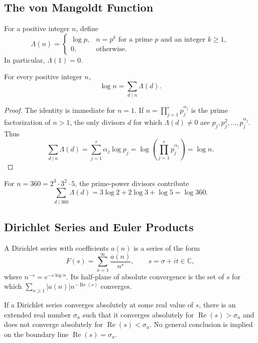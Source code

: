 \subsection{The von Mangoldt Function}

\begin{definition}
For a positive integer $n$, define
\[
 \Lambda(n)=
 \begin{cases}
 \log p,& n=p^k\text{ for a prime }p\text{ and an integer }k\geq1,\\
 0,&\text{otherwise}.
 \end{cases}
\]
In particular, $\Lambda(1)=0$.
\end{definition}

\begin{theorem}
For every positive integer $n$,
\[
 \log n=\sum_{d\mid n}\Lambda(d).
\]
\end{theorem}

\begin{proof}
The identity is immediate for $n=1$. If $n=\prod_{j=1}^r p_j^{\alpha_j}$ is the prime factorization of $n>1$, the only divisors $d$ for which $\Lambda(d)\neq0$ are $p_j,p_j^2,\ldots,p_j^{\alpha_j}$. Thus
\[
 \sum_{d\mid n}\Lambda(d)
 =\sum_{j=1}^r\alpha_j\log p_j
 =\log\left(\prod_{j=1}^r p_j^{\alpha_j}\right)=\log n.
\]
\end{proof}

\begin{example}
For $n=360=2^3\cdot3^2\cdot5$, the prime-power divisors contribute
\[
 \sum_{d\mid360}\Lambda(d)=3\log2+2\log3+\log5=\log360.
\]
\end{example}

\subsection{Dirichlet Series and Euler Products}

\begin{definition}
A Dirichlet series with coefficients $a(n)$ is a series of the form
\[
 F(s)=\sum_{n=1}^{\infty}\frac{a(n)}{n^s},
 \qquad s=\sigma+it\in\mathbb{C},
\]
where $n^{-s}=e^{-s\log n}$. Its half-plane of absolute convergence is the set of $s$ for which $\sum_{n\geq1}|a(n)|n^{-\operatorname{Re}(s)}$ converges.
\end{definition}

\begin{theorem}
If a Dirichlet series converges absolutely at some real value of $s$, there is an extended real number $\sigma_a$ such that it converges absolutely for $\operatorname{Re}(s)>\sigma_a$ and does not converge absolutely for $\operatorname{Re}(s)<\sigma_a$. No general conclusion is implied on the boundary line $\operatorname{Re}(s)=\sigma_a$.
\end{theorem}


